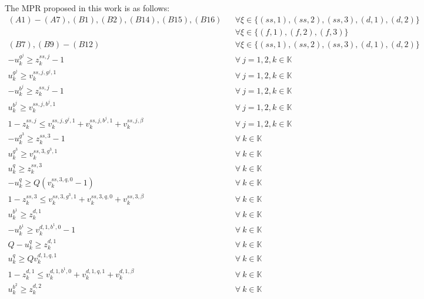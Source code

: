 \documentclass[]{interact}
\theoremstyle{plain}%
\theoremstyle{definition}
\theoremstyle{remark}
\begin{document}
The MPR proposed in this work is as follows: 
\begin{eqnarray}
(A1)-(A7),(B1),(B2),(B14),(B15),(B16)&& \forall \xi \in\{(ss,1),(ss,2),(ss,3),(d,1),(d,2)\}\nonumber\\
&&  \forall\xi \in\{(f,1),(f,2),(f,3)\}\nonumber\\
(B7),(B9)-(B12)&& \forall \xi \in\{(ss,1),(ss,2),(ss,3),(d,1),(d,2)\}\nonumber\\
-u^{g^j}_k\ge z^{ss,j}_k-1&& \forall\ j=1,2,k\in \mathbb{K}\label{merge:ss1,1}\\
u^{g^j}_k\ge v^{ss,j,g^j,1}_k&& \forall\ j=1,2,k\in \mathbb{K}\label{merge:ss1,2}\\
-u^{b^j}_k\ge z^{ss,j}_k-1&& \forall\ j=1,2,k\in \mathbb{K}\label{merge:ss1,3}\\
u^{b^j}_k\ge v^{ss,j,b^j,1}_k&& \forall\ j=1,2,k\in \mathbb{K}\label{merge:ss1,4}\\
1-z^{ss,j}_k\le v^{ss,j,g^j,1}_k+v^{ss,j,b^j,1}_k+v^{ss,j,\beta}_k&& \forall\ j=1,2,k\in \mathbb{K}\label{merge:ss1,5}\\
-u^{g^3}_k\ge z^{ss,3}_k-1&& \forall\ k\in \mathbb{K}\label{merge:ss3,1}\\
u^{g^3}_k\ge v^{ss,3,g^3,1}_k&& \forall\ k\in \mathbb{K}\label{merge:ss3,2}\\
u^{q}_k\ge z^{ss,3}_k&& \forall\ k\in \mathbb{K}\label{merge:ss3,3}\\
-u^{q}_k \ge Q(v^{ss,3,q,0}_k-1)&& \forall\ k\in \mathbb{K}\label{merge:ss3,4}\\
1-z^{ss,3}_k\le v^{ss,3,g^3,1}_k+v^{ss,3,q,0}_k+v^{ss,3,\beta}_k&& \forall\ k\in \mathbb{K}\label{merge:ss3,5}\\
u^{b^1}_k\ge z^{d,1}_k&& \forall\ k\in \mathbb{K}\label{merge:d1,1}\\
-u^{b^1}_k\ge v^{d,1,b^1,0}_k-1&& \forall\ k\in \mathbb{K}\label{merge:d1,2}\\
Q-u^{q}_k\ge z^{d,1}_k&& \forall\ k\in \mathbb{K}\label{merge:d1,3}\\
u^{q}_k\ge Qv^{d,1,q,1}_k&& \forall\ k\in \mathbb{K}\label{merge:d1,4}\\
1-z^{d,1}_k\le v^{d,1,b^1,0}_k+v^{d,1,q,1}_k+v^{d,1,\beta}_k&& \forall\ k\in \mathbb{K}\label{merge:d1,5}\\
u^{b^2}_k\ge z^{d,2}_k&& \forall\ k\in \mathbb{K}\label{merge:d2,1}\\

\end{eqnarray}
\end{document}

